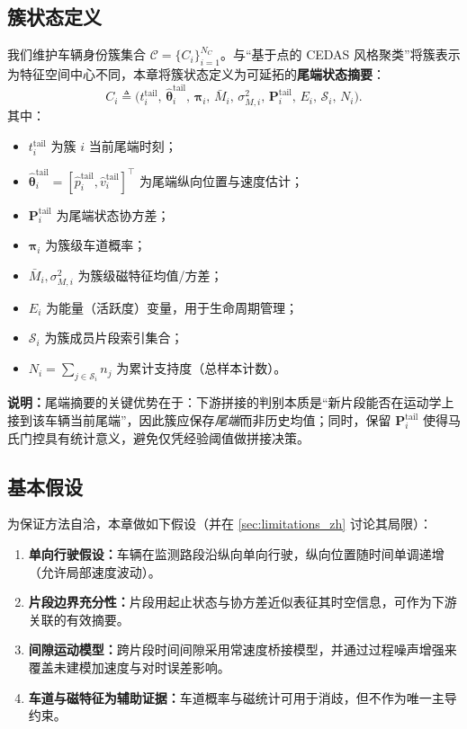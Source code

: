\documentclass{xdupgthesis}
\begin{document}
\subsection{簇状态定义}
我们维护车辆身份簇集合 $\mathcal{C}=\{C_i\}_{i=1}^{N_C}$。与“基于点的 CEDAS 风格聚类”将簇表示为特征空间中心不同，本章将簇状态定义为可延拓的\textbf{尾端状态摘要}：
\begin{equation}
	C_i \triangleq
	\Big(
	t_i^{\mathrm{tail}},\,
	\hat{\boldsymbol{\theta}}_i^{\mathrm{tail}},\,
	\boldsymbol{\pi}_i,\,
	\bar M_i,\, \sigma_{M,i}^2,\,
	\mathbf{P}_i^{\mathrm{tail}},\,
	E_i,\,
	\mathcal{S}_i,\,
	N_i
	\Big).
	\tag{4-5}
\end{equation}
其中：
\begin{itemize}
	\item $t_i^{\mathrm{tail}}$ 为簇 $i$ 当前尾端时刻；
	\item $\hat{\boldsymbol{\theta}}_i^{\mathrm{tail}}=[\hat p_i^{\mathrm{tail}},\hat v_i^{\mathrm{tail}}]^\top$ 为尾端纵向位置与速度估计；
	\item $\mathbf{P}_i^{\mathrm{tail}}$ 为尾端状态协方差；
	\item $\boldsymbol{\pi}_i$ 为簇级车道概率；
	\item $\bar M_i,\sigma_{M,i}^2$ 为簇级磁特征均值/方差；
	\item $E_i$ 为能量（活跃度）变量，用于生命周期管理；
	\item $\mathcal{S}_i$ 为簇成员片段索引集合；
	\item $N_i=\sum_{j\in\mathcal{S}_i} n_j$ 为累计支持度（总样本计数）。
\end{itemize}

\vspace{0.3em}
\noindent\textbf{说明：}尾端摘要的关键优势在于：下游拼接的判别本质是“新片段能否在运动学上接到该车辆当前尾端”，因此簇应保存\emph{尾端}而非历史均值；同时，保留 $\mathbf{P}_i^{\mathrm{tail}}$ 使得马氏门控具有统计意义，避免仅凭经验阈值做拼接决策。%

\subsection{基本假设}
为保证方法自洽，本章做如下假设（并在 \ref{sec:limitations_zh} 讨论其局限）：
\begin{enumerate}
	\item \textbf{单向行驶假设：}车辆在监测路段沿纵向单向行驶，纵向位置随时间单调递增（允许局部速度波动）。
	\item \textbf{片段边界充分性：}片段用起止状态与协方差近似表征其时空信息，可作为下游关联的有效摘要。
	\item \textbf{间隙运动模型：}跨片段时间间隙采用常速度桥接模型，并通过过程噪声增强来覆盖未建模加速度与对时误差影响。
	\item \textbf{车道与磁特征为辅助证据：}车道概率与磁统计可用于消歧，但不作为唯一主导约束。
\end{enumerate}
\end{document}
